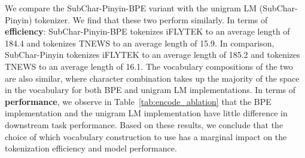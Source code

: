 We compare the SubChar-Pinyin-BPE variant with the unigram LM (SubChar-Pinyin) tokenizer. We find that these two perform similarly. In terms of \textbf{efficiency}: SubChar-Pinyin-BPE tokenizes iFLYTEK to an average length of 184.4 and tokenizes TNEWS to an average length of 15.9. In comparison, SubChar-Pinyin tokenizes iFLYTEK to an average length of 185.2 and tokenizes TNEWS to an average length of 16.1. The vocabulary compositions of the two are also similar, where character combination takes up the majority of the space in the vocabulary for both BPE and unigram LM implementations. 
In terms of \textbf{performance}, we observe in Table~\ref{tab:encode_ablation} that the BPE implementation and the unigram LM implementation have little difference in downstream task performance.
Based on these results, we conclude that the choice of which vocabulary construction to use has a marginal impact on the tokenization efficiency and model performance. 

